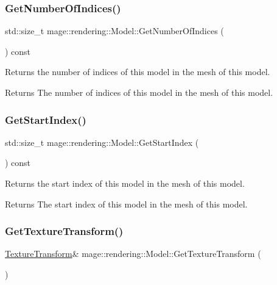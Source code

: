 \subsubsection{\texorpdfstring{Get\+Number\+Of\+Indices()}{GetNumberOfIndices()}}
{\footnotesize\ttfamily std\+::size\+\_\+t mage\+::rendering\+::\+Model\+::\+Get\+Number\+Of\+Indices (\begin{DoxyParamCaption}{ }\end{DoxyParamCaption}) const\hspace{0.3cm}{\ttfamily [noexcept]}}

Returns the number of indices of this model in the mesh of this model.

\begin{DoxyReturn}{Returns}
The number of indices of this model in the mesh of this model. 
\end{DoxyReturn}
\mbox{\label{classmage_1_1rendering_1_1_model_a419dd6f4ea7f32ac3d165ce87d54fb47}} 
\subsubsection{\texorpdfstring{Get\+Start\+Index()}{GetStartIndex()}}
{\footnotesize\ttfamily std\+::size\+\_\+t mage\+::rendering\+::\+Model\+::\+Get\+Start\+Index (\begin{DoxyParamCaption}{ }\end{DoxyParamCaption}) const\hspace{0.3cm}{\ttfamily [noexcept]}}

Returns the start index of this model in the mesh of this model.

\begin{DoxyReturn}{Returns}
The start index of this model in the mesh of this model. 
\end{DoxyReturn}
\mbox{\label{classmage_1_1rendering_1_1_model_a57e4069226ce9bade50bc17503378f08}} 
\subsubsection{\texorpdfstring{Get\+Texture\+Transform()}{GetTextureTransform()}\hspace{0.1cm}{\footnotesize\ttfamily [1/2]}}
{\footnotesize\ttfamily \mbox{\hyperlink{classmage_1_1_texture_transform}{Texture\+Transform}}\& mage\+::rendering\+::\+Model\+::\+Get\+Texture\+Transform (\begin{DoxyParamCaption}{ }\end{DoxyParamCaption})\hspace{0.3cm}{\ttfamily [noexcept]}}


